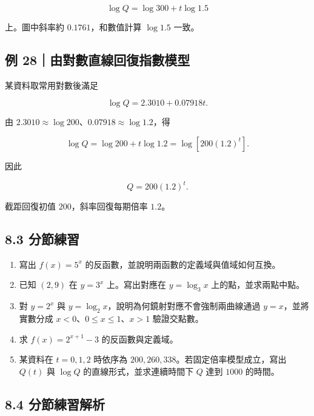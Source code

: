 \documentclass[11pt,a4paper]{article}
\providecommand{\tightlist}{%
  \setlength{\itemsep}{0pt}\setlength{\parskip}{0pt}}
\begin{document}
\[
\log Q=\log300+t\log1.5
\]

上。圖中斜率約 \(0.1761\)，和數值計算 \(\log1.5\) 一致。

\subsection{例 28｜由對數直線回復指數模型}\label{ux4f8b-28ux7531ux5c0dux6578ux76f4ux7ddaux56deux5fa9ux6307ux6578ux6a21ux578b}

某資料取常用對數後滿足

\[
\log Q=2.3010+0.07918t.
\]

由 \(2.3010\approx\log200\)、\(0.07918\approx\log1.2\)，得

\[
\log Q=\log200+t\log1.2
=\log[200(1.2)^t].
\]

因此

\[
Q=200(1.2)^t.
\]

截距回復初值 \(200\)，斜率回復每期倍率 \(1.2\)。

\subsection{8.3 分節練習}\label{ux5206ux7bc0ux7df4ux7fd2-7}

\begin{enumerate}
\def\labelenumi{\arabic{enumi}.}
\tightlist
\item
  寫出 \(f(x)=5^x\) 的反函數，並說明兩函數的定義域與值域如何互換。
\item
  已知 \((2,9)\) 在 \(y=3^x\) 上。寫出對應在 \(y=\log_3x\) 上的點，並求兩點中點。
\item
  對 \(y=2^x\) 與 \(y=\log_2x\)，說明為何鏡射對應不會強制兩曲線通過 \(y=x\)，並將實數分成 \(x<0\)、\(0\le x\le1\)、\(x>1\) 驗證交點數。
\item
  求 \(f(x)=2^{x+1}-3\) 的反函數與定義域。
\item
  某資料在 \(t=0,1,2\) 時依序為 \(200,260,338\)。若固定倍率模型成立，寫出 \(Q(t)\) 與 \(\log Q\) 的直線形式，並求連續時間下 \(Q\) 達到 \(1000\) 的時間。
\end{enumerate}

\subsection{8.4 分節練習解析}\label{ux5206ux7bc0ux7df4ux7fd2ux89e3ux6790-7}
\end{document}
